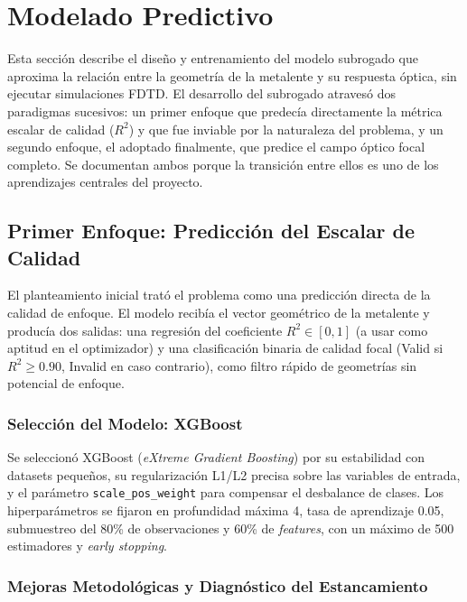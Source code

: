 \section{Modelado Predictivo}\label{sec:modelado}

Esta sección describe el diseño y entrenamiento del modelo subrogado que aproxima la relación entre la geometría de la metalente y su respuesta óptica, sin ejecutar simulaciones FDTD. El desarrollo del subrogado atravesó dos paradigmas sucesivos: un primer enfoque que predecía directamente la métrica escalar de calidad ($R^2$) y que fue inviable por la naturaleza del problema, y un segundo enfoque, el adoptado finalmente, que predice el campo óptico focal completo. Se documentan ambos porque la transición entre ellos es uno de los aprendizajes centrales del proyecto.

\subsection{Primer Enfoque: Predicción del Escalar de Calidad}\label{subsec:enfoque_v1}

El planteamiento inicial trató el problema como una predicción directa de la calidad de enfoque. El modelo recibía el vector geométrico de la metalente y producía dos salidas: una regresión del coeficiente $R^2 \in [0,1]$ (a usar como aptitud en el optimizador) y una clasificación binaria de calidad focal (Valid si $R^2 \geq 0.90$, Invalid en caso contrario), como filtro rápido de geometrías sin
potencial de enfoque.

\subsubsection{Selección del Modelo: XGBoost}

Se seleccionó XGBoost (\textit{eXtreme Gradient Boosting}) por su estabilidad con datasets pequeños, su regularización L1/L2 precisa sobre las variables de entrada, y el parámetro \texttt{scale\_pos\_weight} para compensar el desbalance de clases. Los hiperparámetros se fijaron en profundidad máxima 4, tasa de aprendizaje 0.05, submuestreo del 80\% de observaciones y 60\% de \textit{features}, con un máximo de 500 estimadores y \textit{early stopping}.

\subsubsection{Mejoras Metodológicas y Diagnóstico del Estancamiento}

